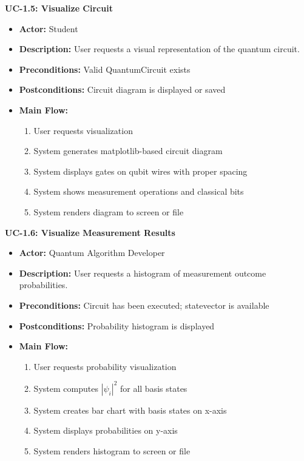 \textbf{UC-1.5: Visualize Circuit}
\begin{itemize}
\item \textbf{Actor:} Student
\item \textbf{Description:} User requests a visual representation of the quantum circuit.
\item \textbf{Preconditions:} Valid QuantumCircuit exists
\item \textbf{Postconditions:} Circuit diagram is displayed or saved
\item \textbf{Main Flow:}
\begin{enumerate}
\item User requests visualization
\item System generates matplotlib-based circuit diagram
\item System displays gates on qubit wires with proper spacing
\item System shows measurement operations and classical bits
\item System renders diagram to screen or file
\end{enumerate}
\end{itemize}

\textbf{UC-1.6: Visualize Measurement Results}
\begin{itemize}
\item \textbf{Actor:} Quantum Algorithm Developer
\item \textbf{Description:} User requests a histogram of measurement outcome probabilities.
\item \textbf{Preconditions:} Circuit has been executed; statevector is available
\item \textbf{Postconditions:} Probability histogram is displayed
\item \textbf{Main Flow:}
\begin{enumerate}
\item User requests probability visualization
\item System computes $|\psi_i|^2$ for all basis states
\item System creates bar chart with basis states on x-axis
\item System displays probabilities on y-axis
\item System renders histogram to screen or file
\end{enumerate}
\end{itemize}

